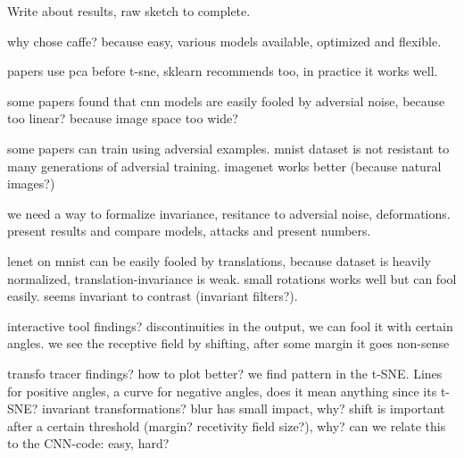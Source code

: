 \documentclass[a4paper,12pt]{article}
\begin{document}
Write about results, raw sketch to complete.

why chose caffe? because easy, various models available, optimized and flexible.

papers use pca before t-sne, sklearn recommends too, in practice it works well.

some papers found that cnn models are easily fooled by adversial noise, because too linear? because image space too wide?

some papers can train using adversial examples. mnist dataset is not resistant to many generations of adversial training. imagenet works better (because natural images?)

we need a way to formalize invariance, resitance to adversial noise, deformations. present results and compare models, attacks and present numbers.

lenet on mnist can be easily fooled by translations, because dataset is heavily normalized, translation-invariance is weak. small rotations works well but can fool easily. seems invariant to contrast (invariant filters?).

interactive tool findings? discontinuities in the output, we can fool it with certain angles. we see the receptive field by shifting, after some margin it goes non-sense

transfo tracer findings? how to plot better? we find pattern in the t-SNE. Lines for positive angles, a curve for negative angles, does it mean anything since its t-SNE? invariant transformations? blur has small impact, why? shift is important after a certain threshold (margin? recetivity field size?), why? can we relate this to the CNN-code: easy, hard?
\end{document}
